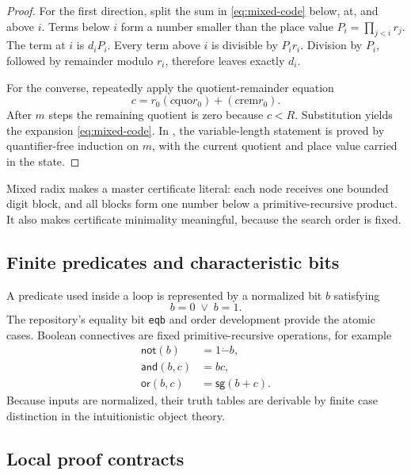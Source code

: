 \begin{proof}
For the first direction, split the sum in \eqref{eq:mixed-code} below, at, and above \(i\).  Terms below \(i\) form a number smaller than the place value \(P_i=\prod_{j<i}r_j\).  The term at \(i\) is \(d_iP_i\).  Every term above \(i\) is divisible by \(P_ir_i\).  Division by \(P_i\), followed by remainder modulo \(r_i\), therefore leaves exactly \(d_i\).

For the converse, repeatedly apply the quotient-remainder equation
\[
  c=r_0(c\mathbin{\mathrm{quo}}r_0)+(c\mathbin{\mathrm{rem}}r_0).
\]
After \(m\) steps the remaining quotient is zero because \(c<R\).  Substitution yields the expansion \eqref{eq:mixed-code}.  In \iPRA, the variable-length statement is proved by quantifier-free induction on \(m\), with the current quotient and place value carried in the state.
\end{proof}

Mixed radix makes a master certificate literal: each node receives one bounded digit block, and all blocks form one number below a primitive-recursive product.  It also makes certificate minimality meaningful, because the search order is fixed.

\subsection{Finite predicates and characteristic bits}

A predicate used inside a loop is represented by a normalized bit \(b\) satisfying
\begin{equation}
  b=0\;\vee\;b=1.
  \label{eq:bit-normal}
\end{equation}
The repository's equality bit \texttt{eqb} and order development provide the atomic cases.  Boolean connectives are fixed primitive-recursive operations, for example
\[
\begin{aligned}
  \mathsf{not}(b)&=1\mathbin{\dot{-}} b,\\
  \mathsf{and}(b,c)&=bc,\\
  \mathsf{or}(b,c)&=\mathsf{sg}(b+c).
\end{aligned}
\]
Because inputs are normalized, their truth tables are derivable by finite case distinction in the intuitionistic object theory.

\subsection{Local proof contracts}

